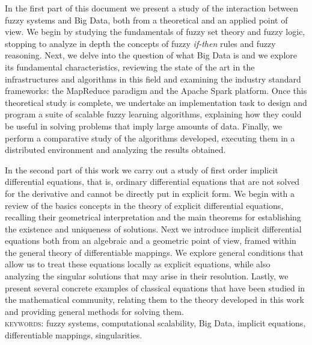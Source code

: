 %
%
%

In the first part of this document we present a study of the interaction between fuzzy systems and Big Data, both from a theoretical and an applied point of view. We begin by studying the fundamentals of fuzzy set theory and fuzzy logic, stopping to analyze in depth the concepts of fuzzy \textit{if-then} rules and fuzzy reasoning. Next, we delve into the question of what Big Data is and we explore its fundamental characteristics, reviewing the state of the art in the infrastructures and algorithms in this field and examining the industry standard frameworks: the MapReduce paradigm and the Apache Spark platform. Once this theoretical study is complete, we undertake an implementation task to design and program a suite of scalable fuzzy learning algorithms, explaining how they could be useful in solving problems that imply large amounts of data. Finally, we perform a comparative study of the algorithms developed, executing them in a distributed environment and analyzing the results obtained.

In the second part of this work we carry out a study of first order implicit differential equations, that is, ordinary differential equations that are not solved for the derivative and cannot be directly put in explicit form. We begin with a review of the basics concepts in the theory of explicit differential equations, recalling their geometrical interpretation and the main theorems for establishing the existence and uniqueness of solutions. Next we introduce implicit differential equations both from an algebraic and a geometric point of view, framed within the general theory of differentiable mappings. We explore general conditions that allow us to treat these equations locally as explicit equations, while also analyzing the singular solutions that may arise in their resolution. Lastly, we present several concrete examples of classical equations that have been studied in the mathematical community, relating them to the theory developed in this work and providing general methods for solving them.\\


\noindent\textsc{keywords:} fuzzy systems, computational scalability, Big Data, implicit equations, differentiable mappings, singularities.
